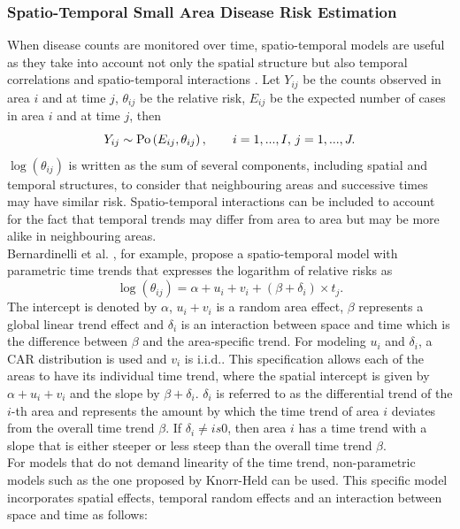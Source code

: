 \subsubsection{Spatio-Temporal Small Area Disease Risk Estimation}
When disease counts are monitored over time, spatio-temporal models are useful as they take into account not only the spatial structure but also temporal correlations and spatio-temporal interactions \autocite[][]{martinez2008autoregressive}. Let $Y_{ij}$ be the counts observed in area $i$ and at time $j$, $\theta_{ij}$ be the relative risk, $E_{ij}$ be the expected number of cases in area $i$ and at time $j$, then
\begin{equation}
    Y_{ij}\sim\hbox{Po}\left(E_{ij}, \theta_{ij}\right), \hspace{20pt} i=1,...,I,\,j=1,...,J.
\end{equation}
$\log\left(\theta_{ij}\right)$ is written as the sum of several components, including spatial and temporal structures, to consider that neighbouring areas and successive times may have similar risk. Spatio-temporal interactions can be included to account for the fact that temporal trends may differ from area to area but may be more alike in neighbouring areas. \\
Bernardinelli et al. \autocite[][]{bernardinelli1995bayesian}, for example, propose a spatio-temporal model with parametric time trends that expresses the logarithm of relative risks as
\begin{equation}
    \log\left(\theta_{ij}\right)=\alpha+u_i+v_i+ \left(\beta+\delta_i\right)\times t_j.
\end{equation}
The intercept is denoted by $\alpha$, $u_i+v_i$ is a random area effect, $\beta$ represents a global linear trend effect and $\delta_i$ is an interaction between space and time which is the difference between $\beta$ and the area-specific trend. For modeling $u_i$ and $\delta_i$, a CAR distribution is used and $v_i$ is i.i.d.. This specification allows each of the areas to have its individual time trend, where the spatial intercept is given by $\alpha+u_i+v_i$ and the slope by $\beta+\delta_i$. $\delta_i$ is referred to as the differential trend of the $i$-th area and represents the amount by which the time trend of area $i$ deviates from the overall time trend $\beta$. If $\delta_i\neq is 0$, then area $i$ has a time trend with a slope that is either steeper or less steep than the overall time trend $\beta$. \\
For models that do not demand linearity of the time trend, non-parametric models such as the one proposed by Knorr-Held \autocite[][]{knorr2000bayesian} can be used. This specific model incorporates spatial effects, temporal random effects and an interaction between space and time as follows:
